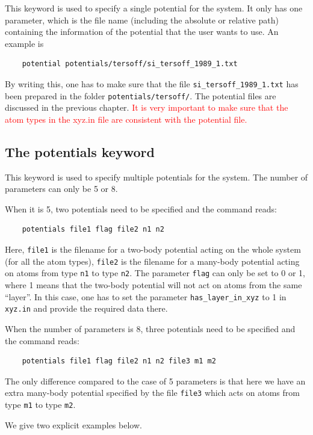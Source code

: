 \documentclass[12pt,a4paper]{report}
\begin{document}
This keyword is used to specify a single potential for the system. It only has one parameter, which is the file name (including the absolute or relative path) containing the information of the potential that the user wants to use. An example is
\begin{verbatim}
    potential potentials/tersoff/si_tersoff_1989_1.txt
\end{verbatim}
By writing this, one has to make sure that the file \verb"si_tersoff_1989_1.txt" has been prepared in the folder \verb"potentials/tersoff/".
The potential files are discussed in the previous chapter. \textcolor{red}{It is very important to make sure that the atom types in the xyz.in file are consistent with the potential file.}

\subsection{The potentials keyword}

This keyword is used to specify multiple potentials for the system. The number of parameters can only be 5 or 8. 

When it is 5, two potentials need to be specified and the command reads:
\begin{verbatim}
    potentials file1 flag file2 n1 n2
\end{verbatim}
Here, \verb"file1" is the filename for a two-body potential acting on the whole system (for all the atom types), \verb"file2" is the filename for a many-body potential acting on atoms from type \verb"n1" to type \verb"n2". The parameter \verb"flag" can only be set to 0 or 1, where 1 means that the two-body potential will not act on atoms from the same ``layer''. In this case, one has to set the parameter \verb"has_layer_in_xyz" to 1 in \verb"xyz.in" and provide the required data there.

When the number of parameters is 8, three potentials need to be specified and the command reads:
\begin{verbatim}
    potentials file1 flag file2 n1 n2 file3 m1 m2
\end{verbatim}
The only difference compared to the case of 5 parameters is that here we have an extra many-body potential specified by the file \verb"file3" which acts on atoms from type \verb"m1" to type \verb"m2".

We give two explicit examples below.
\end{document}
